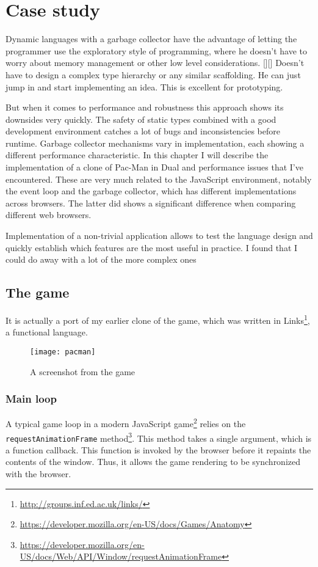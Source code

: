 \chapter{Case study}\label{chap:case}
Dynamic languages with a garbage collector have the advantage of letting the programmer use the exploratory style of programming, where he doesn't have to worry about memory management or other low level considerations. [][] Doesn't have to design a complex type hierarchy or any similar scaffolding. He can just jump in and start implementing an idea. This is excellent for prototyping.

But when it comes to performance and robustness this approach shows its downsides very quickly. The safety of static types combined with a good development environment catches a lot of bugs and inconsistencies before runtime. Garbage collector mechanisms vary in implementation, each showing a different performance characteristic. In this chapter I will describe the implementation of a clone of Pac-Man in Dual and performance issues that I've encountered. These are very much related to the JavaScript environment, notably the event loop and the garbage collector, which has different implementations across browsers. The latter did shows a significant difference when comparing different web browsers.

Implementation of a non-trivial application allows to test the language design and quickly establish which features are the most useful in practice.
I found that I could do away with a lot of the more complex ones %

\section{The game}
It is actually a port of my earlier clone of the game, which was written in Links\footnote{\url{http://groups.inf.ed.ac.uk/links/}}, a functional language.

\begin{figure}[h!]
\centering
\texttt{[image: pacman]}
\caption{A screenshot from the game}
\label{fig:pacman}
\end{figure}


\subsection{Main loop}
A typical game loop in a modern JavaScript game\footnote{\url{https://developer.mozilla.org/en-US/docs/Games/Anatomy}} relies on the \texttt{requestAnimationFrame} method\footnote{\url{https://developer.mozilla.org/en-US/docs/Web/API/Window/requestAnimationFrame}}. This method takes a single argument, which is a function callback. This function is invoked by the browser before it repaints the contents of the window. Thus, it allows the game rendering to be synchronized with the browser.


